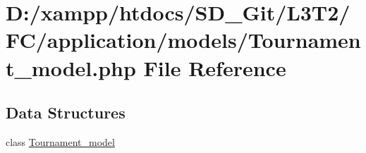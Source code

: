 \hypertarget{_tournament__model_8php}{}\section{D\+:/xampp/htdocs/\+S\+D\+\_\+\+Git/\+L3\+T2/\+F\+C/application/models/\+Tournament\+\_\+model.php File Reference}
\label{_tournament__model_8php}
\subsection*{Data Structures}
\begin{DoxyCompactItemize}
\item 
class \hyperlink{class_tournament__model}{Tournament\+\_\+model}
\end{DoxyCompactItemize}
